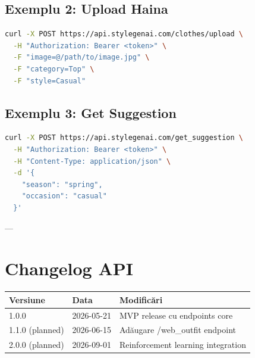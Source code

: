 \subsection{Exemplu 2: Upload Haina}

\begin{lstlisting}[language=bash]
curl -X POST https://api.stylegenai.com/clothes/upload \
  -H "Authorization: Bearer <token>" \
  -F "image=@/path/to/image.jpg" \
  -F "category=Top" \
  -F "style=Casual"
\end{lstlisting}

\subsection{Exemplu 3: Get Suggestion}

\begin{lstlisting}[language=bash]
curl -X POST https://api.stylegenai.com/get_suggestion \
  -H "Authorization: Bearer <token>" \
  -H "Content-Type: application/json" \
  -d '{
    "season": "spring",
    "occasion": "casual"
  }'
\end{lstlisting}

---

\section{Changelog API}

\begin{table}[h]
    \centering
    \begin{tabular}{|l|l|p{4cm}|}
    \hline
    \textbf{Versiune} & \textbf{Data} & \textbf{Modificări} \\ \hline
    1.0.0 & 2026-05-21 & MVP release cu endpoints core \\ \hline
    1.1.0 (planned) & 2026-06-15 & Adăugare /web\_outfit endpoint \\ \hline
    2.0.0 (planned) & 2026-09-01 & Reinforcement learning integration \\ \hline
    \end{tabular}
\end{table}

